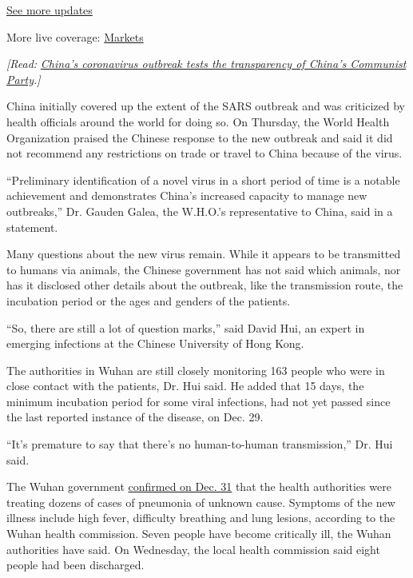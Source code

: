\href{https://www.nytimes3xbfgragh.onion/2020/09/09/world/covid-coronavirus.html?action=click\&pgtype=Article\&state=default\&region=MAIN_CONTENT_1\&context=storylines_live_updates}{See
more updates}

More live coverage:
\href{https://www.nytimes3xbfgragh.onion/live/2020/09/09/business/stock-market-today-coronavirus?action=click\&pgtype=Article\&state=default\&region=MAIN_CONTENT_1\&context=storylines_live_updates}{Markets}

\emph{{[}Read:}
\href{https://www.nytimes3xbfgragh.onion/2020/01/21/world/asia/china-coronavirus-australia-wuhan-travel.html}{\emph{China's
coronavirus outbreak tests the transparency of China's Communist
Party}}\emph{.{]}}

China initially covered up the extent of the SARS outbreak and was
criticized by health officials around the world for doing so. On
Thursday, the World Health Organization praised the Chinese response to
the new outbreak and said it did not recommend any restrictions on trade
or travel to China because of the virus.

``Preliminary identification of a novel virus in a short period of time
is a notable achievement and demonstrates China's increased capacity to
manage new outbreaks,'' Dr. Gauden Galea, the W.H.O.'s representative to
China, said in a statement.

Many questions about the new virus remain. While it appears to be
transmitted to humans via animals, the Chinese government has not said
which animals, nor has it disclosed other details about the outbreak,
like the transmission route, the incubation period or the ages and
genders of the patients.

``So, there are still a lot of question marks,'' said David Hui, an
expert in emerging infections at the Chinese University of Hong Kong.

The authorities in Wuhan are still closely monitoring 163 people who
were in close contact with the patients, Dr. Hui said. He added that 15
days, the minimum incubation period for some viral infections, had not
yet passed since the last reported instance of the disease, on Dec. 29.

``It's premature to say that there's no human-to-human transmission,''
Dr. Hui said.

The Wuhan government
\href{http://wjw.wuhan.gov.cn/front/web/showDetail/2019123108989}{confirmed
on Dec. 31} that the health authorities were treating dozens of cases of
pneumonia of unknown cause. Symptoms of the new illness include high
fever, difficulty breathing and lung lesions, according to the Wuhan
health commission. Seven people have become critically ill, the Wuhan
authorities have said. On Wednesday, the local health commission said
eight people had been discharged.

